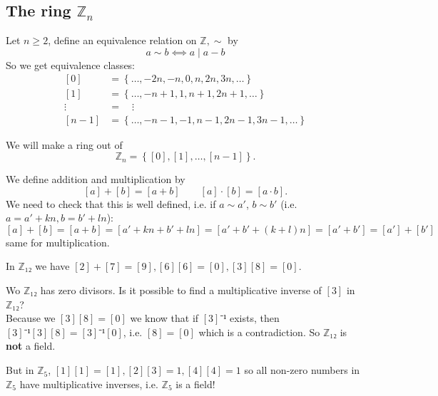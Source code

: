 \documentclass[english]{lbscript}
\begin{document}
\subsection{The ring \(ℤ_n\)}
\label{sec:ring-_n}

Let \(n≥2\), define an equivalence relation on \(ℤ, \sim\) by
\begin{equation}
  \label{eq:100}
  a \sim b ⟺ a \mid a-b
\end{equation}
So we get equivalence classes:
\begin{align*}
  \label{eq:101}
  [0]         & =\left\{ \dots, -2n, -n, 0, n, 2n, 3n, \dots \right\}      \\
  [1]         & =\left\{ \dots, -n+1, 1, n+1, 2n+1, \dots \right\}         \\
  \vdots \;\; & =\quad  \vdots                                             \\
  [n-1]       & = \left\{ \dots, -n-1, -1, n-1, 2n-1, 3n-1, \dots \right\}
\end{align*}

We will make a ring out of
\begin{equation}
  \label{eq:104}
  ℤ_{n}=\left\{ [0], [1], \dots, [n-1] \right\}.
\end{equation}

We define addition and multiplication by
\begin{equation}
  \label{eq:102}
  [a]+[b]=[a+b]\quad \quad [a]⋅[b]=[a⋅b].
\end{equation}
We need to check that this is well defined, i.e. if \(a\sim a'\), \(b\sim b'\) (i.e. \(a=a'+kn, b=b'+ln\)):
\begin{equation}
  \label{eq:103}
  [a] + [b]= [a+b] = [a'+kn+b'+ln]=[a'+b'+(k+l)n]=[a'+b']=[a']+[b']
\end{equation}
same for multiplication.

\begin{example}{}{}
  In \(ℤ₁₂\) we have \([2]+[7]=[9], [6][6]=[0], [3][8]=[0]\).

  Wo \(ℤ₁₂\) has zero divisors. Is it possible to find a multiplicative inverse of \([3]\) in \(ℤ₁₂\)?\\
  Because we \([3][8]=[0]\) we know that if \([3]⁻¹\) exists, then \([3]⁻¹[3][8]=[3]⁻¹[0]\), i.e. \([8]=[0]\) which is a contradiction. So \(ℤ₁₂\) is \textbf{not} a field.

  But in \(ℤ_{5}\), \([1][1]=[1], [2][3]=1, [4][4]=1\) so all non-zero numbers in \(ℤ_{5}\) have multiplicative inverses, i.e. \(ℤ_{5}\) is a field!
\end{example}
\end{document}
